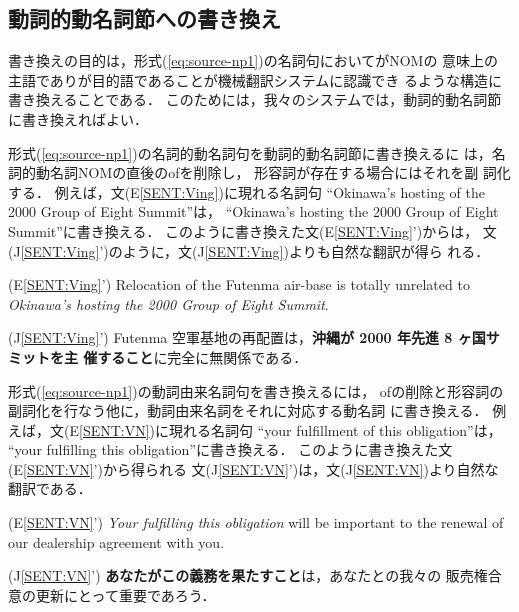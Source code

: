 \subsection{動詞的動名詞節への書き換え}
\label{sec:rewrite:action}

書き換えの目的は，形式(\ref{eq:source-np1})の名詞句において\NP がNOMの
意味上の主語であり\NPpost が目的語であることが機械翻訳システムに認識でき
るような構造に書き換えることである．
このためには，我々のシステムでは，動詞的動名詞節に書き換えればよい．

形式(\ref{eq:source-np1})の名詞的動名詞句を動詞的動名詞節に書き換えるに
は，名詞的動名詞NOMの直後のofを削除し， 形容詞が存在する場合にはそれを副
詞化する．
例えば，文(E\ref{SENT:Ving})に現れる名詞句
``Okinawa's hosting of the 2000 Group of Eight Summit''は，
``Okinawa's hosting the 2000 Group of Eight Summit''に書き換える．
このように書き換えた文(E\ref{SENT:Ving}')からは，
文(J\ref{SENT:Ving}')のように，文(J\ref{SENT:Ving})よりも自然な翻訳が得ら
れる．
\begin{list}{}{\setlength{\leftmargin}{6em}
\setlength{\labelsep}{1em}
\setlength{\labelwidth}{\leftmargin}
\addtolength{\labelwidth}{-\labelsep}
\setlength{\itemsep}{0ex}}
\item[(E\ref{SENT:Ving}')\hspace*{1mm}]
Relocation of the Futenma air-base is totally unrelated to
{\it Okinawa's hosting the 2000 Group of Eight Summit}. 
\item[(J\ref{SENT:Ving}')\hspace*{1mm}]
Futenma 空軍基地の再配置は，{\bf 沖縄が 2000 年先進 8 ヶ国サミットを主
催すること}に完全に無関係である． 
\end{list}

形式(\ref{eq:source-np1})の動詞由来名詞句を書き換えるには，
ofの削除と形容詞の副詞化を行なう他に，動詞由来名詞をそれに対応する動名詞
に書き換える．
例えば，文(E\ref{SENT:VN})に現れる名詞句
``your fulfillment of this obligation''は，
``your fulfilling this obligation''に書き換える．
このように書き換えた文(E\ref{SENT:VN}')から得られる
文(J\ref{SENT:VN}')は，文(J\ref{SENT:VN})より自然な翻訳である．
\begin{list}{}{\setlength{\leftmargin}{6em}
\setlength{\labelsep}{1em}
\setlength{\labelwidth}{\leftmargin}
\addtolength{\labelwidth}{-\labelsep}
\setlength{\itemsep}{0ex}}
\item[(E\ref{SENT:VN}')\hspace*{1mm}]
{\it Your fulfilling this obligation} will be important 
to the renewal of our dealership agreement with you. 
\item[(J\ref{SENT:VN}')\hspace*{1mm}]
{\bf あなたがこの義務を果たすこと}は，あなたとの我々の
販売権合意の更新にとって重要であろう．
\end{list}

